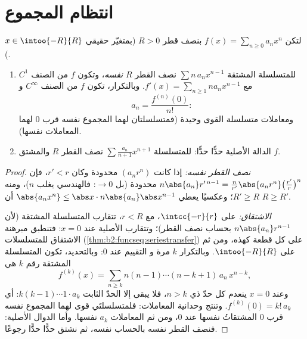 \section{انتظام المجموع}

\begin{theorem}[الحساب حدًّا حدًّا]\label{thm:b2:powerseries:calculus}
لتكن $f(x) = \sum_{n\geq0} a_n x^n$ بنصف قطر $R > 0$ (بمتغيّر
حقيقي $x \in \intoo{-R}{R}$).
\begin{enumerate}
  \item للمتسلسلة المشتقة $\sum n\,a_n x^{n-1}$ نصف القطر $R$ \emph{نفسه}، وتكون $f$ من الصنف $C^1$ مع $f'(x) = \sum_{n \geq 1}
        n a_n x^{n-1}$. وبالتكرار، تكون $f$ من الصنف $C^\infty$ و
        \[
        a_n = \frac{f^{(n)}(0)}{n!} :
        \]
        ومعاملات متسلسلة القوى وحيدة (فمتسلسلتان
        لهما المجموع نفسه قرب $0$ لهما المعاملات نفسها).
  \item الدالة الأصلية حدًّا حدًّا: للمتسلسلة $\sum \frac{a_n}{n+1}x^{n+1}$
        نصف القطر $R$ والمشتق $f$.
\end{enumerate}
\end{theorem}

\begin{proof}
\emph{نصف القطر نفسه:} إذا كانت $(a_nr^n)$ محدودة وكان $r' < r$، فإن
$n\abs{a_n} r'^{\,n-1} = \frac{n}{r'}\abs{a_nr^n}
\bigl(\frac{r'}{r}\bigr)^n$ محدودة (بل $\to 0$: فالهندسي
يغلب $n$)، ومنه $R' \geq R$؛ وعكسيًا يعطي $\abs{a_n x^n} \leq \abs x
\cdot n\abs{a_n}\abs x^{n-1}$ أن $R \geq R'$.

\emph{الاشتقاق:} على $\intcc{-r}{r}$، مع $r < R$، تتقارب المتسلسلة
المشتقة  (لأن $n\abs{a_n}r^{n-1}$  بحساب
نصف القطر)؛ وتتقارب الأصلية عند $x = 0$: فتنطبق مبرهنة
الاشتقاق للمتسلسلات
(\cref{thm:b2:funcseq:seriestransfer}) على كل قطعة كهذه،
ومن ثم على $\intoo{-R}{R}$. وبالتكرار $k$ مرة و
التقييم عند $0$: وبالتحديد، تكون المتسلسلة المشتقة رقم $k$ هي
\[
f^{(k)}(x) = \sum_{n\geq k} n(n-1)\cdots(n-k+1)\,a_n\,x^{n-k},
\]
وعند $x = 0$ ينعدم كل حدّ ذي $n > k$، فلا يبقى إلا
الحدّ الثابت $k(k-1)\cdots1\cdot a_k$: أي $f^{(k)}(0) =
k!\,a_k$. وتنتج وحدانية المعاملات: فلمتسلسلتَي قوى
لهما المجموع نفسه قرب $0$ المشتقاتُ نفسها عند $0$،
ومن ثم المعاملات $a_k$ نفسها. وأما الدوال الأصلية: فنصف القطر نفسه بالحساب
نفسه، ثم نشتق حدًّا حدًّا رجوعًا.
\end{proof}

